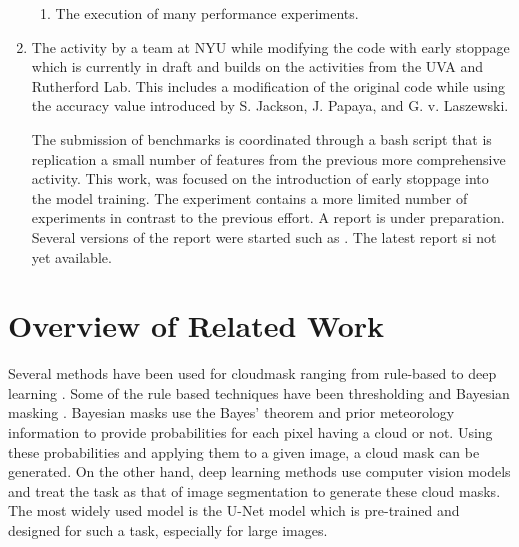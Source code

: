 \documentclass[sigplan,screen]{acmart}
\begin{document}
\begin{enumerate}
\begin{enumerate}
    \item The execution of many performance experiments.

\end{enumerate}

\item The activity by a team at NYU while modifying the code with early stoppage which is currently in draft and builds on the activities from the UVA and Rutherford Lab. This includes a modification of the original code while using the accuracy value introduced by S. Jackson, J. Papaya, and G. v. Laszewski.

The submission of benchmarks is coordinated through a bash script that is replication a small number of features from the previous more comprehensive activity. This work, was focused on the introduction of early stoppage into the model training. The experiment contains a more limited number of experiments in contrast to the previous effort. A report is under preparation. Several versions of the report were started such as \cite{las23-cloudmask}. The latest report si not yet available.

\end{enumerate}


\section{Overview of Related Work}

Several methods have been used for cloudmask ranging from rule-based \cite{Saunders1986AnAS,Saunders1988AnIM,Merchant2005ProbabilisticPB, Zhu2012ObjectbasedCA} to deep learning \cite{Li2019DeepLB,Domnich2021KappaMaskAC,Yan2018CloudAC,WIELAND2019111203,JEPPESEN2019247}. Some of the rule based techniques have been thresholding \cite{Saunders1986AnAS,Saunders1988AnIM} and Bayesian masking \cite{Merchant2005ProbabilisticPB}. Bayesian masks use the Bayes' theorem and prior meteorology information to provide probabilities for each pixel having a cloud or not. Using these probabilities and applying them to a given image, a cloud mask can be generated. On the other hand, deep learning methods\cite{Li2019DeepLB,Domnich2021KappaMaskAC,Yan2018CloudAC,WIELAND2019111203,JEPPESEN2019247} use computer vision models and treat the task as that of image segmentation to generate these cloud masks. The most widely used model is the U-Net \cite{Ronneberger2015UNetCN} model which is pre-trained and designed for such a task, especially for large images.
\end{document}
